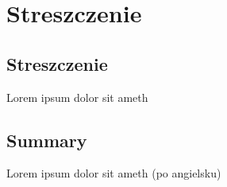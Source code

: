 \chapter{Streszczenie}
\label{cha:streszczenie}

\section{Streszczenie}
\label{sec:streszczenie}

Lorem ipsum dolor sit ameth


\section{Summary}
\label{sec:summary}

Lorem ipsum dolor sit ameth (po angielsku)


